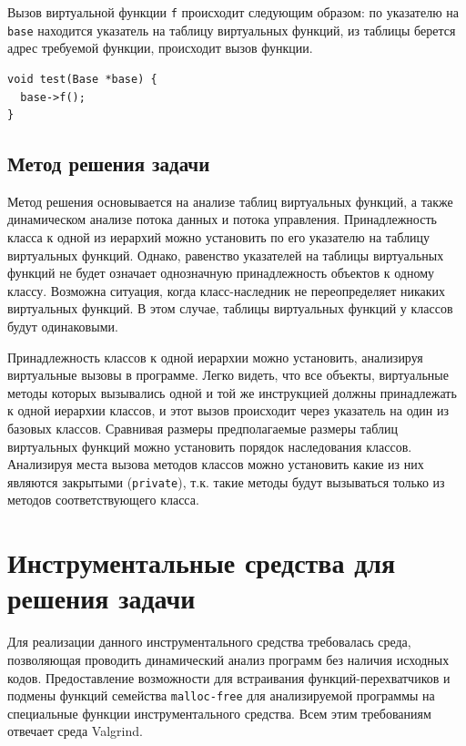 \documentclass[a4paper,12pt,russian]{article}
\begin{document}
Вызов виртуальной функции \texttt{f} происходит следующим образом: по указателю на \texttt{base} находится указатель на таблицу виртуальных функций, из таблицы берется адрес требуемой функции, происходит вызов функции.
\begin{lstlisting}
void test(Base *base) {
  base->f();
}
\end{lstlisting}

\subsection{Метод решения задачи}
Метод решения основывается на анализе таблиц виртуальных функций, а также динамическом анализе потока данных и потока управления.
Принадлежность класса к одной из иерархий можно установить по его указателю на таблицу виртуальных функций.
Однако, равенство указателей на таблицы виртуальных функций не будет означает однозначную принадлежность объектов к одному классу.
Возможна ситуация, когда класс-наследник не переопределяет никаких виртуальных функций.
В этом случае, таблицы виртуальных функций у классов будут одинаковыми.

Принадлежность классов к одной иерархии можно установить, анализируя виртуальные вызовы в программе.
Легко видеть, что все объекты, виртуальные методы которых вызывались одной и той же инструкцией должны принадлежать к одной иерархии классов, и этот вызов происходит через указатель на один из базовых классов. Сравнивая размеры предполагаемые размеры таблиц виртуальных функций можно установить порядок наследования классов.
Анализируя места вызова методов классов можно установить какие из них являются закрытыми (\texttt{private}), т.к. такие методы будут вызываться только из методов соответствующего класса.

\newpage
\section{Инструментальные средства для решения задачи}
\label{valgrind_section}
Для реализации данного инструментального средства требовалась среда, позволяющая проводить динамический анализ программ без наличия исходных кодов.
Предоставление возможности для встраивания функций-перехватчиков и подмены функций семейства \texttt{malloc-free} для анализируемой программы на специальные функции инструментального средства.
Всем этим требованиям отвечает среда Valgrind.
\end{document}
